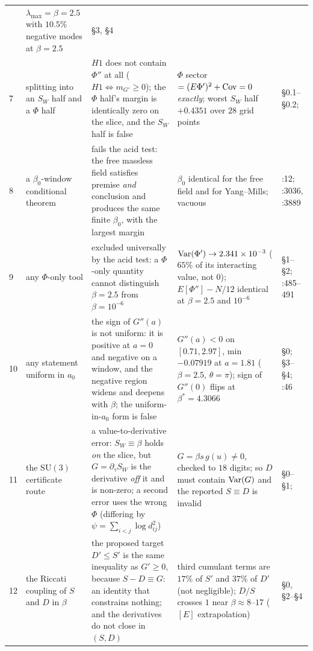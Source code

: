 {\begin{longtable}{@{}L{0.45cm}L{2.1cm}L{4.55cm}L{2.55cm}L{4.3cm}@{}}
  & $\lambda_{\max}=\beta=2.5$ with $10.5\%$ negative modes at $\beta=2.5$
  &  \S3, \S4 \\
7 & \LN{} splitting into an $S_W$ half and a $\Phi$ half
  & $H1$ does not contain $\Phi''$ at all ($H1\iff m_{G'}\ge0$); the $\Phi$ half's margin is
    identically zero on the slice, and the $S_W$ half is false
  & $\Phi$ sector $=(E\Phi')^{2}+\operatorname{Cov}=0$ \emph{exactly}; worst $S_W$ half $+0.4351$ over
    $28$ grid points
  &  \S0.1--\S0.2;  \\
8 & \LN{} a $\beta_0$-window conditional theorem
  & fails the acid test: the free massless field satisfies premise \emph{and} conclusion and
    produces the same finite $\beta_0$, with the largest margin
  & $\beta_0$ identical for the free field and for Yang--Mills; vacuous
  & :12; :3036, :3889 \\
9 & \LN{} any $\Phi$-only tool
  & excluded universally by the acid test: a $\Phi$-only quantity cannot distinguish
    $\beta=2.5$ from $\beta=10^{-6}$
  & $\operatorname{Var}(\Phi')\to2.341\times10^{-3}$ ($65\%$ of its interacting value, not $0$);
    $E[\Phi'']-N/12$ identical at $\beta=2.5$ and $10^{-6}$
  &  \S1--\S2; :485--491 \\
10 & \LN{} any statement uniform in $a_0$
  & the sign of $G''(a)$ is not uniform: it is positive at $a=0$ and negative on a window, and
    the negative region widens and deepens with $\beta$; the uniform-in-$a_0$ form is false
  & $G''(a)<0$ on $[0.71,2.97]$, min $-0.07919$ at $a=1.81$ ($\beta=2.5$, $\theta=\pi$);
    sign of $G''(0)$ flips at $\beta^{*}=4.3066$
  &  \S0;  \S3--\S4;
    :46 \\
11 & \LN{} the $\mathrm{SU}(3)$ certificate route
  & a value-to-derivative error: $S_W\equiv\beta$ holds \emph{on} the slice, but $G=\partial_\tau
    S_W$ is the derivative \emph{off} it and is non-zero; a second error uses the wrong $\Phi$
    (differing by $\psi=\sum_{i<j}\log d_{ij}^{2}$)
  & $G=\beta s\,g(u)\ne0$, checked to $18$ digits; so $D$ must contain $\operatorname{Var}(G)$ and the reported
    $S\equiv D$ is invalid
  &  \S0--\S1;  \\
12 & \LN{} the Riccati coupling of $S$ and $D$ in $\beta$
  & the proposed target $D'\le S'$ is the same inequality as $G'\ge0$, because $S-D\equiv G$:
    an identity that constrains nothing; and the derivatives do not close in $(S,D)$
  & third cumulant terms are $17\%$ of $S'$ and $37\%$ of $D'$ (not negligible);
    $D/S$ crosses $1$ near $\beta\approx8$--$17$ ($[E]$ extrapolation)
  &  \S0, \S2--\S4 \\
\bottomrule
\end{longtable}
}

